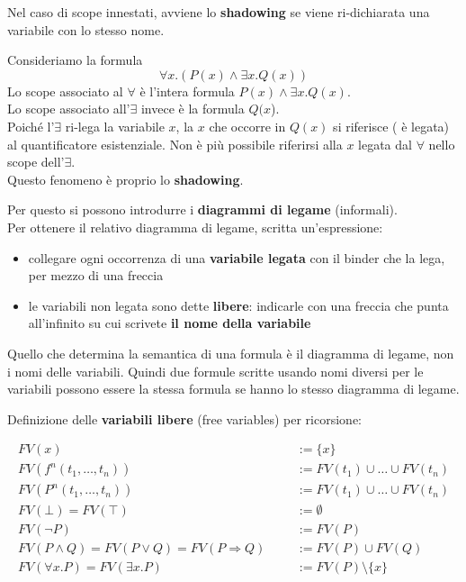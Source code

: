 \documentclass[
  a4paper,
]{article}
\providecommand{\tightlist}{%
  \setlength{\itemsep}{0pt}\setlength{\parskip}{0pt}}
\begin{document}
Nel caso di scope innestati, avviene lo \textbf{shadowing} se viene
ri-dichiarata una variabile con lo stesso nome.

\begin{examplebox}[Esempio]

Consideriamo la formula \[
\forall x.(P(x) \land \exists x.Q(x))
\] Lo scope associato al \(\forall\) è l'intera formula
\(P(x) \land \exists x.Q(x)\).\\
Lo scope associato all'\(\exists\) invece è la formula \(Q(x\)).\\
Poiché l'\(\exists\) ri-lega la variabile \(x\), la \(x\) che occorre in
\(Q(x)\) si riferisce ( è legata) al quantificatore esistenziale. Non è
più possibile riferirsi alla \(x\) legata dal \(\forall\) nello scope
dell'\(\exists\).\\
Questo fenomeno è proprio lo \textbf{shadowing}.

\end{examplebox}

Per questo si possono introdurre i \textbf{diagrammi di legame}
(informali).\\
Per ottenere il relativo diagramma di legame, scritta un'espressione:

\begin{itemize}
\tightlist
\item
  collegare ogni occorrenza di una \textbf{variabile legata} con il
  binder che la lega, per mezzo di una freccia
\item
  le variabili non legata sono dette \textbf{libere}: indicarle con una
  freccia che punta all'infinito su cui scrivete \textbf{il nome della
  variabile}
\end{itemize}

Quello che determina la semantica di una formula è il diagramma di
legame, non i nomi delle variabili. Quindi due formule scritte usando
nomi diversi per le variabili possono essere la stessa formula se hanno
lo stesso diagramma di legame.

Definizione delle \textbf{variabili libere} (free variables) per
ricorsione:

\[
\begin{aligned}
FV(x) &&& := \{x\} \\[6pt] 
FV(f^n(t_1,\dots, t_n)) &&& := FV(t_1) \cup \dots\cup FV(t_n) \\[6pt]
FV(P^n(t_1,\dots, t_n)) &&& := FV(t_1) \cup \dots\cup FV(t_n) \\[6pt]
FV(\bot) = FV(\top) &&& := \emptyset \\[6pt]
FV(\neg P) &&& := FV(P) \\[6pt]
FV(P \land Q) = FV(P \lor Q) = FV(P \Rightarrow Q) &&& := FV(P) \cup FV(Q) \\[6pt]
FV(\forall x.P) = FV(\exists x.P) &&& := FV(P) \setminus \{x\}
\end{aligned}
\]
\end{document}
